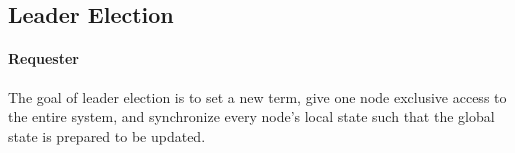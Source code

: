 
\subsection{Leader Election}
\label{subsec:leader-election}


\paragraph{Requester}
The goal of leader election is to set a new term, give one node exclusive access to the
entire system, and synchronize every node's local state such that the
global state is prepared to be updated.

